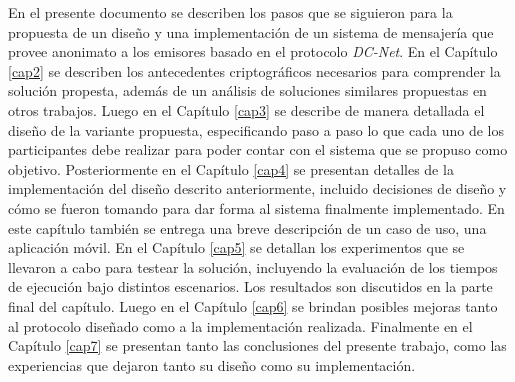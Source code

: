 En el presente documento se describen los pasos que se siguieron para la propuesta de un diseño y una implementación de un sistema de mensajería que 
provee anonimato a los emisores basado en el protocolo \emph{DC-Net}. En el Capítulo \ref{cap2} se describen los antecedentes criptográficos 
necesarios para comprender la solución propesta, además de un análisis de soluciones similares propuestas en otros trabajos. Luego en el Capítulo \ref{cap3} 
se describe de manera detallada el diseño de la variante propuesta, especificando paso a paso lo que cada uno de los participantes debe realizar 
para poder contar con el sistema que se propuso como objetivo. Posteriormente en el Capítulo \ref{cap4} se presentan detalles de la implementación del diseño 
descrito anteriormente, incluido decisiones de diseño y cómo se fueron tomando para dar forma al sistema finalmente implementado. En este capítulo también se entrega una breve 
descripción de un caso de uso, una aplicación móvil. En el Capítulo \ref{cap5} se detallan los experimentos que se llevaron a cabo para testear la solución, incluyendo la evaluación de los tiempos de ejecución bajo distintos escenarios. Los resultados son discutidos en la parte 
final del capítulo. Luego en el Capítulo \ref{cap6} se 
brindan posibles mejoras tanto al protocolo diseñado como a la implementación realizada. Finalmente en el Capítulo \ref{cap7} se 
presentan tanto las conclusiones del presente trabajo, como las experiencias que dejaron tanto su diseño como su implementación.
